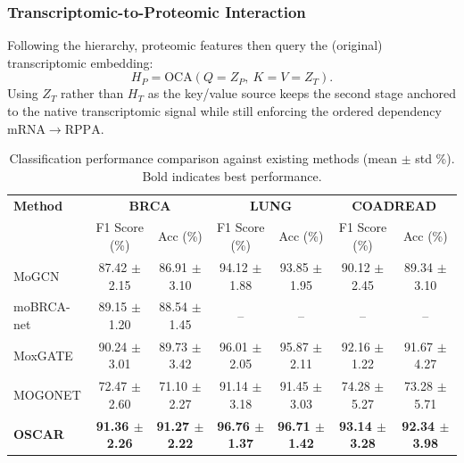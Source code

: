 \documentclass[lettersize,journal]{IEEEtran}
\begin{document}
\subsubsection{Transcriptomic-to-Proteomic Interaction}
Following the hierarchy, proteomic features then query the (original) transcriptomic embedding:
\begin{equation}
    H_P = \mathrm{OCA}(Q=Z_P,\ K{=}V=Z_T).
\end{equation}
Using $Z_T$ rather than $H_T$ as the key/value source keeps the second stage anchored to the native transcriptomic signal while still enforcing the ordered dependency $\mathrm{mRNA}\rightarrow\mathrm{RPPA}$.


\begin{table}[htbp]
\centering
\small
\caption{Classification performance comparison against existing methods (mean $\pm$ std \%). Bold indicates best performance.}
\label{tab:results}
\begin{tabular}{l|cc|cc|cc}
\hline
\textbf{Method} & \multicolumn{2}{c|}{\textbf{BRCA}} & \multicolumn{2}{c|}{\textbf{LUNG}} & \multicolumn{2}{c}{\textbf{COADREAD}} \\
 & F1 Score (\%) & Acc (\%) & F1 Score (\%) & Acc (\%) & F1 Score (\%) & Acc (\%) \\ \hline
MoGCN \cite{MoGCN2022} & 87.42 $\pm$ 2.15 & 86.91 $\pm$ 3.10 & 94.12 $\pm$ 1.88 & 93.85 $\pm$ 1.95 & 90.12 $\pm$ 2.45 & 89.34 $\pm$ 3.10 \\
moBRCA-net \cite{moBRCAnat2023} & 89.15 $\pm$ 1.20 & 88.54 $\pm$ 1.45 & -- & -- & -- & -- \\
MoxGATE \cite{MoxGATE2023} & 90.24 $\pm$ 3.01 & 89.73 $\pm$ 3.42 & 96.01 $\pm$ 2.05 & 95.87 $\pm$ 2.11 & 92.16 $\pm$ 1.22 & 91.67 $\pm$ 4.27 \\ 
MOGONET \cite{MOGONET2021} & 72.47 $\pm$ 2.60 & 71.10 $\pm$ 2.27 & 91.14 $\pm$ 3.18 & 91.45 $\pm$ 3.03 & 74.28 $\pm$ 5.27 & 73.28 $\pm$ 5.71 \\ \hline
\textbf{OSCAR} & \textbf{91.36 $\pm$ 2.26} & \textbf{91.27 $\pm$ 2.22} & \textbf{96.76 $\pm$ 1.37} & \textbf{96.71 $\pm$ 1.42} & \textbf{93.14 $\pm$ 3.28} & \textbf{92.34 $\pm$ 3.98} \\ \hline
\end{tabular}
\end{table}
\end{document}
